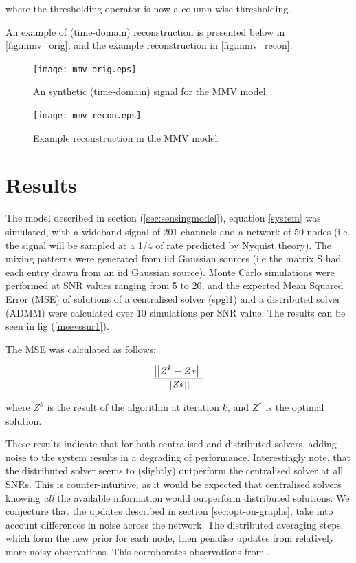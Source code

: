 where the thresholding operator is now a column-wise thresholding.

An example of (time-domain) reconstruction is presented below in \eqref{fig:mmv_orig}, and the example reconstruction in \eqref{fig:mmv_recon}.

\begin{figure}[h]
\centering
\texttt{[image: mmv\_orig.eps]}
\caption{An synthetic (time-domain) signal for the MMV model.}
\label{fig:mmv_orig}
\end{figure}

\begin{figure}[h]
\centering
\texttt{[image: mmv\_recon.eps]}
\caption{Example reconstruction in the MMV model.}
\label{fig:mmv_recon}
\end{figure}


\section{Results} \label{sec:results}

The model described in section (\ref{sec:sensingmodel}), equation \eqref{system} was simulated, with a wideband signal of 201 channels and a network of 50 nodes (i.e. the signal will be sampled at a 1/4 of rate predicted by Nyquist theory). The mixing patterns were generated from iid Gaussian sources (i.e the matrix S had each entry drawn from an iid Gaussian source). Monte Carlo simulations were performed at SNR values ranging from 5 to 20, and the expected Mean Squared Error (MSE) of solutions of a centralised solver (spgl1) and a distributed solver (ADMM) were calculated over 10 simulations per SNR value. The results can be seen in fig (\ref{msevssnr1}). 

The MSE was calculated as follows:

\begin{equation}
\frac{\left|\left|Z^k - Z*\right|\right|}{\left|\left|Z*\right|\right|}
\end{equation}

where \(Z^k\) is the result of the algorithm at iteration \(k\), and \(Z^*\) is the optimal solution.

These results indicate that for both centralised and distributed solvers, adding noise to the system results in a degrading of performance. Interestingly note, that the distributed solver seems to (slightly) outperform the centralised solver at all SNRs. This is counter-intuitive, as it would be expected that centralised solvers knowing \textit{all} the available information would outperform distributed solutions. We conjecture that the updates described in section \eqref{sec:opt-on-graphs}, take into account differences in noise across the network. The distributed averaging steps, which form the new prior for each node, then penalise updates from relatively more noisy observations. This corroborates observations from \cite{bazerque2008}.

